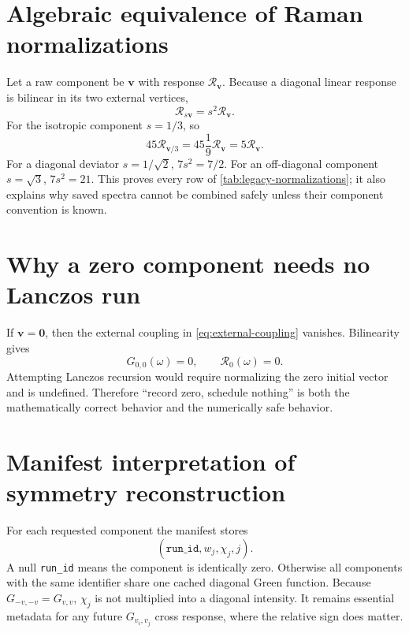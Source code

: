 \documentclass[11pt,a4paper]{article}
\begin{document}
\appendix
\section{Algebraic equivalence of Raman normalizations}

Let a raw component be $\bm v$ with response
$\mathcal R_{\bm v}$.  Because a diagonal linear response is bilinear in its
two external vertices,
\begin{equation}
  \mathcal R_{s\bm v}=s^2\mathcal R_{\bm v}.
\end{equation}
For the isotropic component $s=1/3$, so
\begin{equation}
  45\mathcal R_{\bm v/3}=45\frac{1}{9}\mathcal R_{\bm v}
  =5\mathcal R_{\bm v}.
\end{equation}
For a diagonal deviator $s=1/\sqrt2$,
$7s^2=7/2$.  For an off-diagonal component $s=\sqrt3$,
$7s^2=21$.  This proves every row of
\cref{tab:legacy-normalizations}; it also explains why saved spectra cannot be
combined safely unless their component convention is known.

\section{Why a zero component needs no Lanczos run}

If $\bm v=\bm0$, then the external coupling in
\cref{eq:external-coupling} vanishes.  Bilinearity gives
\begin{equation}
  G_{0,0}(\omega)=0,
  \qquad \mathcal R_0(\omega)=0.
\end{equation}
Attempting Lanczos recursion would require normalizing the zero initial vector
and is undefined.  Therefore ``record zero, schedule nothing'' is both the
mathematically correct behavior and the numerically safe behavior.

\section{Manifest interpretation of symmetry reconstruction}

For each requested component the manifest stores
\begin{equation}
  (\texttt{run\_id},w_j,\chi_j,j).
\end{equation}
A null \texttt{run\_id} means the component is identically zero.  Otherwise
all components with the same identifier share one cached diagonal Green
function.  Because $G_{-v,-v}=G_{v,v}$, $\chi_j$ is not multiplied into a
diagonal intensity.  It remains essential metadata for any future
$G_{v_i,v_j}$ cross response, where the relative sign does matter.
\end{document}
